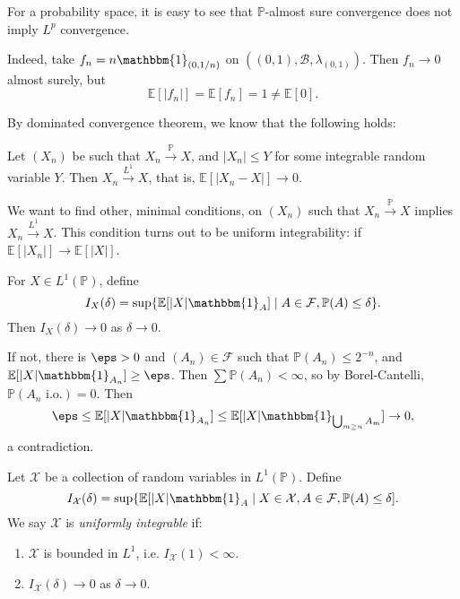\documentclass[12pt]{article}
\begin{document}
For a probability space, it is easy to see that $\mathbb{P}$-almost sure convergence does not imply $L^p$ convergence.

Indeed, take $f_n = n \mathbbm{1}_{(0, 1/n)}$ on $((0,1), \mathcal{B}, \lambda_{(0,1)})$. Then $f_n \to 0$ almost surely, but
\[
\mathbb{E}[|f_n|] = \mathbb{E}[f_n] = 1 \neq \mathbb{E}[0].
\]

By dominated convergence theorem, we know that the following holds:

\begin{theorem}
	Let $(X_n)$ be such that $X_n \overset{\mathbb{P}}{\to} X$, and $|X_n| \leq Y$ for some integrable random variable $Y$. Then $X_n \overset{L^1}{\to} X$, that is, $\mathbb{E}[|X_n - X|] \to 0$.
\end{theorem}

We want to find other, minimal conditions, on $(X_n)$ such that $X_n \overset{\mathbb{P}}{\to} X$ implies $X_n \overset{L^1}{\to} X$. This condition turns out to be uniform integrability: if $\mathbb{E}[|X_n|] \to \mathbb{E}[|X|]$.

For $X \in L^1(\mathbb{P})$, define
\[
	I_X(\delta) = \sup\{ \mathbb{E}[|X|\mathbbm{1}_{A}] \mid A \in \mathcal{F}, \mathbb{P}(A) \leq \delta\}.
\]
Then $I_X(\delta) \to 0$ as $\delta \to 0$.

If not, there is $\eps > 0$ and $(A_n) \in \mathcal{F}$ such that $\mathbb{P}(A_n) \leq 2^{-n}$, and $\mathbb{E}[|X|\mathbbm{1}_{A_n}] \geq \eps$. Then $\sum \mathbb{P}(A_n) < \infty$, so by Borel-Cantelli, $\mathbb{P}(A_n \text{ i.o.}) = 0$. Then
\[
\eps \leq \mathbb{E}[|X|\mathbbm{1}_{A_n}] \leq \mathbb{E}[|X| \mathbbm{1}_{\bigcup_{m \geq n} A_m}] \to 0,
\]
a contradiction.

\begin{definition}
	Let $\mathcal{X}$ be a collection of random variables in $L^1(\mathbb{P})$. Define
	\[
	I_{\mathcal{X}}(\delta) = \sup \{\mathbb{E}[|X|\mathbbm{1}_{A} \mid X \in \mathcal{X}, A \in \mathcal{F}, \mathbb{P}(A) \leq \delta].
	\]
	We say $\mathcal{X}$ is \emph{uniformly integrable} if:
	\begin{enumerate}
		\item $\mathcal{X}$ is bounded in $L^1$, i.e. $I_{\mathcal{X}}(1) < \infty$.
		\item $I_{\mathcal{X}}(\delta) \to 0$ as $\delta \to 0$.
	\end{enumerate}
\end{definition}
\end{document}
